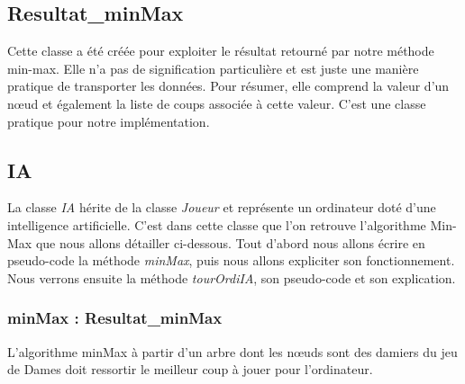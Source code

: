 \documentclass[12,french]{report}
\begin{document}
\subsection{Resultat\_minMax}

Cette classe a été créée pour exploiter le résultat retourné par notre méthode min-max. Elle n'a pas de signification particulière et est juste une manière pratique de transporter les données. Pour résumer, elle comprend la valeur d'un nœud et également la liste de coups associée à cette valeur. C'est une classe pratique pour notre implémentation.

\subsection{IA}

La classe \textit{IA} hérite de la classe \textit{Joueur} et représente un ordinateur doté d'une intelligence artificielle. C'est dans cette classe que l'on retrouve l'algorithme Min-Max que nous allons détailler ci-dessous. Tout d'abord nous allons écrire en pseudo-code la méthode \textit{minMax}, puis nous allons expliciter son fonctionnement. Nous verrons ensuite la méthode \textit{tourOrdiIA}, son pseudo-code et son explication.

\subsubsection{minMax : Resultat\_minMax}

%


L'algorithme minMax à partir d'un arbre dont les nœuds sont des damiers du jeu de Dames doit ressortir le meilleur coup à jouer pour l'ordinateur.\\
\end{document}
